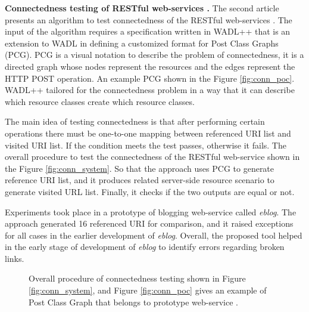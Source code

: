 \documentclass[english]{tktltiki}
\begin{document}
\textbf{Connectedness testing of RESTful web-services \cite{chakrabarti2010connectedness}.} The second article presents an algorithm to test connectedness of the RESTful web-services \cite{chakrabarti2010connectedness}. The input of the algorithm requires a specification written in WADL++ that is an extension to WADL in defining a customized format for Post Class Graphs (PCG). PCG is a visual notation to describe the problem of connectedness, it is a directed graph whose nodes represent the resources and the edges represent the HTTP POST operation. An example PCG shown in the Figure \ref{fig:conn_poc}. WADL++ tailored for the connectedness problem in a way that it can describe which resource classes create which resource classes.

The main idea of testing connectedness is that after performing certain operations there must be one-to-one mapping between referenced URI list and visited URI list. If the condition meets the test passes, otherwise it fails. The overall procedure to test the connectedness of the RESTful web-service shown in the Figure \ref{fig:conn_system}. So that the approach uses PCG to generate reference URI list, and it produces related server-side resource scenario to generate visited URL list. Finally, it checks if the two outputs are equal or not.

Experiments took place in a prototype of blogging web-service called \textit{eblog}. The approach generated 16 referenced URI for comparison, and it raised exceptions for all cases in the earlier development of \textit{eblog}. Overall, the proposed tool helped in the early stage of development of \textit{eblog} to identify errors regarding broken links.
\begin{figure}[h]
	\centering
	\hfill%
	\caption{Overall procedure of connectedness testing shown in Figure \ref{fig:conn_system}, and Figure \ref{fig:conn_poc} gives an example of Post Class Graph that belongs to prototype web-service \cite{chakrabarti2010connectedness}.}
\end{figure}
\end{document}
